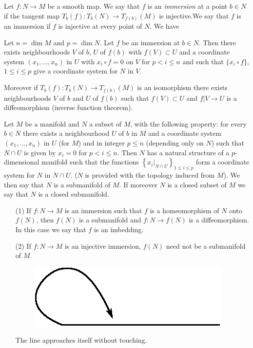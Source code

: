 Let $f:N\to M$ be a smooth map. We say that $f$ is an {\em immersion} at a point $b\in N$ if the tangent map $T_{b}(f):T_{b}(N)\to T_{f(b)}(M)$ is injective.\pageoriginale We say that $f$ is an immersion if $f$ is injective at every point of $N$. We have

\begin{theorem}\label{sec7-thm7.1}
Let $n=\dim M$ and $p=\dim N$. Let $f$ be an immersion at $b\in N$. Then there exists neighbourhoods $V$ of $b$, $U$ of $f(b)$ with $f(V)\subset U$ and a coordinate system $(x_{1},\ldots,x_{n})$ in $U$ with $x_{i}\circ f=0$ on $V$ for $p<i\leq n$ and such that $\{x_{i}\circ f\}$, $1\leq i\leq p$ give a coordinate system for $N$ in $V$.
\end{theorem}

Moreover if $T_{b}(f):T_{b}(N)\to T_{f(b)}(M)$ is an isomorphism there exists neighbourhoods $V$ of $b$ and $U$ of $f(b)$ such that $f(V)\subset U$ and $f|V\to U$ is a diffeomorphism (inverse function theorem).

Let $M$ be a manifold and $N$ a subset of $M$, with the following property: for every $b\in N$ there exists a neighbourhood $U$ of $b$ in $M$ and a coordinate system $(x_{1},\ldots,x_{n})$ in $U$ (for $M$) and in integer $p\leq n$ (depending only on $N$) such that $N\cap U$ is given by $x_{i}=0$ for $p<i\leq n$. Then $N$ has a natural structure of a $p$-dimensional manifold such that the functions $\left\{x_{i}|_{N\cap U}\right\}_{1\leq i\leq p}$ form a coordinate system for $N$ in $N\cap U$. ($N$ is provided with the topology induced from $M$). We then say that $N$ is a submanifold of $M$. If moreover $N$ is a closed subset of $M$ we say that $N$ is a closed submanifold.

\begin{remarks*}
\begin{itemize}
\item[(1)] If $f:N\to M$ is an immersion such that $f$ is a homeomorphism of $N$ onto $f(N)$, then $f(N)$ is a submanifold and $f:N\to f(N)$ is a diffeomorphism. In this case we say that $f$ is an imbedding.

\item[(2)] If $f:N\to M$ is an injective immersion, $f(N)$ need not be a submanifold of $M$.
\begin{figure}[H]
\centering
\includegraphics{1.eps}
\end{figure}\pageoriginale
The line approaches itself without touching.
\end{itemize}
\end{remarks*}

